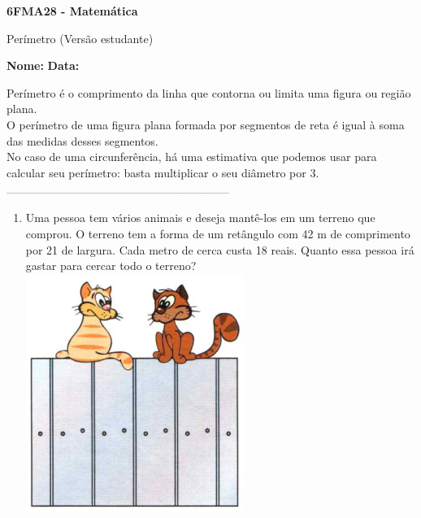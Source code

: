 \documentclass[a4paper,14pt]{article}
\begin{document}
	
	\noindent\textbf{6FMA28 - Matemática} 
	
	\begin{center}Perímetro (Versão estudante)
	\end{center}
	
	\noindent\textbf{Nome:} \underline{\hspace{10cm}}
	\noindent\textbf{Data:} \underline{\hspace{4cm}}
	
	
	\begin{multicols}{2}
		\noindent Perímetro é o comprimento da linha que contorna ou limita uma figura ou região plana. \\
		O perímetro de uma figura plana formada por segmentos de reta é igual à soma das medidas desses segmentos. \\
		No caso de uma circunferência, há uma estimativa que podemos usar para calcular seu perímetro: basta multiplicar o seu diâmetro por 3.
		\\
		\noindent\textsubscript{-----------------------------------------------------------------------}
		\begin{enumerate} 
			\item Uma pessoa tem vários animais e deseja mantê-los em um terreno que comprou. O terreno tem a forma de um retângulo com 42 m de comprimento por 21 de largura. Cada metro de cerca custa 18 reais. Quanto essa pessoa irá gastar para cercar todo o terreno? \\ \includegraphics[width=1\linewidth]{6FMA28_imagens/imagem1} \\

\end{enumerate}
\end{multicols}
\end{document}
